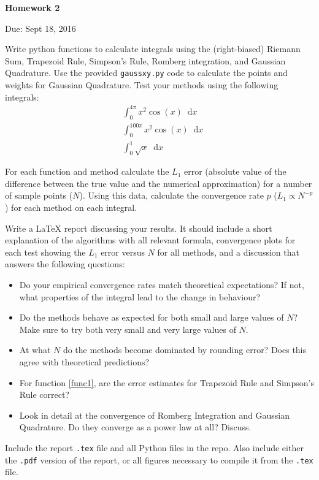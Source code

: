 \documentclass{article}
\newcommand*\diff{\mathop{}\!\mathrm{d}}
\begin{document}
\begin{center}

\vspace*{-2.5cm}
\LARGE
\bf{Homework 2}
\vspace{1cm}

\large{Due: Sept 18, 2016}
\vspace{1cm}

\end{center}

Write python functions to calculate integrals using the (right-biased) Riemann Sum, Trapezoid Rule, Simpson's Rule, Romberg integration, and Gaussian Quadrature.  Use the provided \texttt{gaussxy.py} code to calculate the points and weights for Gaussian Quadrature.  Test your methods using the following integrals:
\begin{align}
& \int_0^{4\pi} x^2 \cos(x) \diff x \label{func1}\\
& \int_0^{100\pi} x^2 \cos(x) \diff x \\
& \int_0^1 \sqrt{x} \diff x 
\end{align}

For each function and method calculate the $L_1$ error (absolute value of the difference between the true value and the numerical approximation) for a number of sample points ($N$).  Using this data, calculate the convergence rate $p$ ($L_1 \propto N^{-p}$) for each method on each integral.

Write a \LaTeX{}  report discussing your results. It should include a short explanation of the algorithms with all relevant formula, convergence plots for each test showing the $L_1$ error versus $N$ for all methods, and a discussion that answers the following questions:
\begin{itemize}
	\item Do your empirical convergence rates match theoretical expectations? If not, what properties of the integral lead to the change in behaviour?
	\item Do the methods behave as expected for both small and large values of $N$?  Make sure to try both very small and very large values of $N$.
	\item At what $N$ do the methods become dominated by rounding error?  Does this agree with theoretical predictions?
	\item For function \eqref{func1}, are the error estimates for Trapezoid Rule and Simpson's Rule correct?
	\item Look in detail at the convergence of Romberg Integration and Gaussian Quadrature. Do they converge as a power law at all? Discuss.
\end{itemize}

Include the report \texttt{.tex} file and all Python files in the repo.  Also include either the \texttt{.pdf} version of the report, or all figures necessary to compile it from the \texttt{.tex} file.
\end{document}
